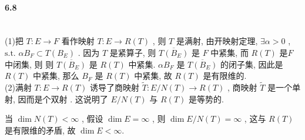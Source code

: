 \documentclass[UTF8]{ctexart}
\begin{document}
    \paragraph{6.8}\quad\\
        \noindent(1)\quad 把 $T : E \rightarrow F$ 看作映射 $T : E \rightarrow R(T)$ , 则 $T$ 是满射, 由开映射定理, $\exists \alpha > 0$ , $\text{s.t. } \alpha B_F \subset T(B_E)$ .
        因为 $T$ 是紧算子, 则 $\overline{T(B_E)}$ 是 $F$ 中紧集, 而 $R(T)$ 是$F$ 中闭集, 则 则 $\overline{T(B_E)}$ 是 $R(T)$ 中紧集.
        $\alpha B_F$ 是 $\overline{T(B_E)}$ 的闭子集, 因此是 $R(T)$ 中紧集, 那么 $B_F$ 是 $R(T)$ 中紧集, 故 $R(T)$ 是有限维的.\\

        \noindent(2)\quad 满射 $T : E \rightarrow R(T)$ 诱导了商映射 $\tilde{T} : E / N(T) \rightarrow R(T)$ , 商映射 $\tilde{T}$ 是一个单射, 因而是个双射 . 这说明了 $E / N(T)$ 与 $R(T)$ 是等势的. 
        
        当 $\dim N(T) < \infty$ , 假设 $\dim E = \infty$ , 则 $\dim E / N(T) = \infty$ , 这与 $R(T)$ 是有限维的矛盾, 故 $\dim E < \infty$.
\end{document}

